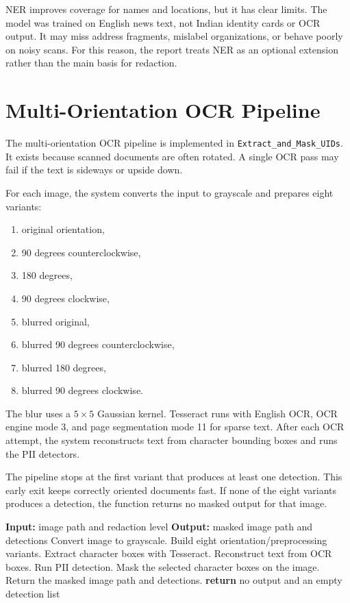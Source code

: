 NER improves coverage for names and locations, but it has clear limits. The model was trained on English news text, not Indian identity cards or OCR output. It may miss address fragments, mislabel organizations, or behave poorly on noisy scans. For this reason, the report treats NER as an optional extension rather than the main basis for redaction.

\section{Multi-Orientation OCR Pipeline}

The multi-orientation OCR pipeline is implemented in \texttt{Extract\_and\_Mask\_UIDs}. It exists because scanned documents are often rotated. A single OCR pass may fail if the text is sideways or upside down.

For each image, the system converts the input to grayscale and prepares eight variants:

\begin{enumerate}
    \item original orientation,
    \item 90 degrees counterclockwise,
    \item 180 degrees,
    \item 90 degrees clockwise,
    \item blurred original,
    \item blurred 90 degrees counterclockwise,
    \item blurred 180 degrees,
    \item blurred 90 degrees clockwise.
\end{enumerate}

The blur uses a $5 \times 5$ Gaussian kernel. Tesseract runs with English OCR, OCR engine mode 3, and page segmentation mode 11 for sparse text. After each OCR attempt, the system reconstructs text from character bounding boxes and runs the PII detectors.

The pipeline stops at the first variant that produces at least one detection. This early exit keeps correctly oriented documents fast. If none of the eight variants produces a detection, the function returns no masked output for that image.

\begin{algorithmic}[1]
\STATE \textbf{Input:} image path and redaction level
\STATE \textbf{Output:} masked image path and detections
\STATE Convert image to grayscale.
\STATE Build eight orientation/preprocessing variants.
    \STATE Extract character boxes with Tesseract.
    \STATE Reconstruct text from OCR boxes.
    \STATE Run PII detection.
        \STATE Mask the selected character boxes on the image.
        \STATE Return the masked image path and detections.
    \ENDIF
\ENDFOR
\STATE \textbf{return} no output and an empty detection list
\end{algorithmic}

